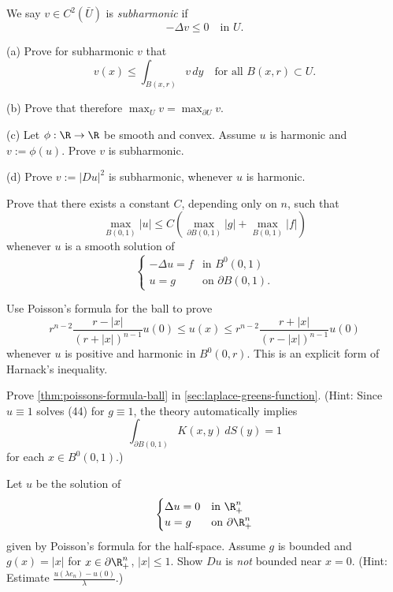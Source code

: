 \begin{exercise}
We say $v \in C^2(\bar{U})$ is \textit{subharmonic} if
$$-\Delta v \le 0 \quad \text{in } U.$$

(a) Prove for subharmonic $v$ that
$$v(x) \le \int_{B(x,r)} v \, dy \quad \text{for all } B(x,r) \subset U.$$

(b) Prove that therefore $\max_U v = \max_{\partial U} v$.

(c) Let $\phi : \R \to \R$ be smooth and convex. Assume $u$ is harmonic and $v := \phi(u)$. Prove $v$ is subharmonic.

(d) Prove $v := |Du|^2$ is subharmonic, whenever $u$ is harmonic.
\end{exercise}

\begin{exercise}
Prove that there exists a constant $C$, depending only on $n$, such that
$$\max_{B(0,1)} |u| \le C\left(\max_{\partial B(0,1)} |g| + \max_{B(0,1)} |f|\right)$$
whenever $u$ is a smooth solution of
$$\begin{cases}
-\Delta u = f & \text{in } B^0(0,1) \\
u = g & \text{on } \partial B(0,1).
\end{cases}$$
\end{exercise}

\begin{exercise}
Use Poisson's formula for the ball to prove
$$r^{n-2} \frac{r-|x|}{(r+|x|)^{n-1}} u(0) \le u(x) \le r^{n-2} \frac{r+|x|}{(r-|x|)^{n-1}} u(0)$$
whenever $u$ is positive and harmonic in $B^0(0,r)$. This is an explicit form of Harnack's inequality.
\end{exercise}

\begin{exercise}
Prove \cref{thm:poissons-formula-ball} in \cref{sec:laplace-greens-function}. (Hint: Since $u \equiv 1$ solves (44) for $g \equiv 1$, the theory automatically implies
$$\int_{\partial B(0,1)} K(x,y) \, dS(y) = 1$$
for each $x \in B^0(0,1)$.)
\end{exercise}

\begin{exercise}
Let $u$ be the solution of
$$\begin{cases}
\Delta u = 0 & \text{in } \R^n_+ \\
u = g & \text{on } \partial \R^n_+
\end{cases}$$
given by Poisson's formula for the half-space. Assume $g$ is bounded and $g(x) = |x|$ for $x \in \partial\R^n_+$, $|x| \le 1$. Show $Du$ is \textit{not} bounded near $x = 0$. (Hint: Estimate $\frac{u(\lambda e_n)-u(0)}{\lambda}$.)
\end{exercise}

